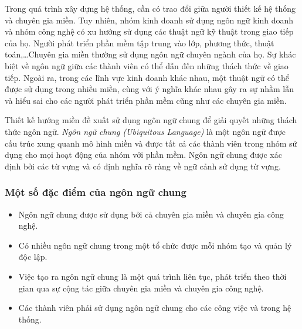 Trong quá trình xây dựng hệ thống, cần có trao đổi giữa người thiết kế hệ thống và chuyên gia miền. Tuy nhiên, nhóm kinh doanh sử dụng ngôn ngữ kinh doanh và nhóm công nghệ có xu hướng sử dụng các thuật ngữ kỹ thuật trong giao tiếp của họ. Người phát triển phần mềm tập trung vào lớp, phương thức, thuật toán,\dots Chuyên gia miền thường sử dụng ngôn ngữ chuyên ngành của họ. Sự khác biệt về ngôn ngữ giữa các thành viên có thể dẫn đến những thách thức về giao tiếp. Ngoài ra, trong các lĩnh vực kinh doanh khác nhau, một thuật ngữ có thể được sử dụng trong nhiều miền, cùng với ý nghĩa khác nhau gây ra sự nhầm lẫn và hiểu sai cho các người phát triển phần mềm cũng như các chuyên gia miền.

Thiết kế hướng miền đề xuất sử dụng ngôn ngữ chung để giải quyết những thách thức ngôn ngữ. \emph{Ngôn ngữ chung (Ubiquitous Language)} là một ngôn ngữ được cấu trúc xung quanh mô hình miền và được tất cả các thành viên trong nhóm sử dụng cho mọi hoạt động của nhóm với phần mềm. Ngôn ngữ chung được xác định bởi các từ vựng và có định nghĩa rõ ràng về ngữ cảnh sử dụng từ vựng.

\subsubsection{Một số đặc điểm của ngôn ngữ chung}

\begin{itemize}

\item Ngôn ngữ chung được sử dụng bởi cả chuyên gia miền và chuyên gia công nghệ.

\item Có nhiều ngôn ngữ chung trong một tổ chức được mỗi nhóm tạo và quản lý   độc lập.

\item Việc tạo ra ngôn ngữ chung là một quá trình liên tục, phát triển theo thời gian   qua sự cộng tác giữa  chuyên gia miền và   chuyên gia công nghệ.

\item Các thành viên phải sử dụng ngôn ngữ chung cho các  công việc và trong     hệ thống.

\end{itemize}

